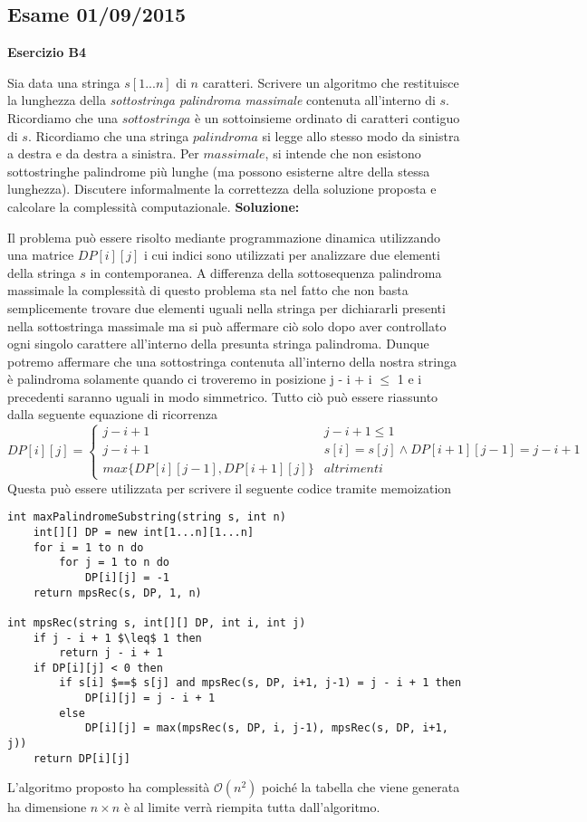 \documentclass[../cheatSheetAlgoritmi.tex]{subfiles}
\begin{document}
\subsection{Esame 01/09/2015}
\textbf{Esercizio B4}

Sia data una stringa $s[1...n]$ di $n$ caratteri. Scrivere un algoritmo che restituisce la lunghezza della \emph{sottostringa palindroma massimale} contenuta all'interno di $s$. Ricordiamo che una $sottostringa$ è un sottoinsieme ordinato di caratteri contiguo di $s$. Ricordiamo che una stringa $palindroma$ si legge allo stesso modo da sinistra a destra e da destra a sinistra. Per $massimale$, si intende che non esistono sottostringhe palindrome più lunghe (ma possono esisterne altre della stessa lunghezza). Discutere informalmente la correttezza della soluzione proposta e calcolare la complessità computazionale.
\textbf{Soluzione:}

Il problema può essere risolto mediante programmazione dinamica utilizzando una matrice $DP[i][j]$ i cui indici sono utilizzati per analizzare due elementi della stringa $s$ in contemporanea. A differenza della sottosequenza palindroma massimale la complessità di questo problema sta nel fatto che non basta semplicemente trovare due elementi uguali nella stringa per dichiararli presenti nella sottostringa massimale ma si può affermare ciò solo dopo aver controllato ogni singolo carattere all'interno della presunta stringa palindroma. Dunque potremo affermare che una sottostringa contenuta all'interno della nostra stringa è palindroma solamente quando ci troveremo in posizione j - i + i $\leq$ 1 e i precedenti saranno uguali in modo simmetrico. Tutto ciò può essere riassunto dalla seguente equazione di ricorrenza
\begin{equation*}
  	DP[i][j]=\begin{cases}
  		j - i + 1 & \text{$j - i + 1 \leq 1$}\\
  		j - i + 1 & \text{$s[i] = s[j] \land DP[i+1][j-1] = j - i + 1$}\\
  		max\{DP[i][j-1], DP[i+1][j]\} & \text{$altrimenti$}
  	\end{cases}
\end{equation*}
Questa può essere utilizzata per scrivere il seguente codice tramite memoization
\begin{lstlisting}[caption=Sottostringa Palindroma Massimale]
int maxPalindromeSubstring(string s, int n)
	int[][] DP = new int[1...n][1...n]
	for i = 1 to n do
		for j = 1 to n do
			DP[i][j] = -1
	return mpsRec(s, DP, 1, n)
	
int mpsRec(string s, int[][] DP, int i, int j)
	if j - i + 1 $\leq$ 1 then
		return j - i + 1
	if DP[i][j] < 0 then
		if s[i] $==$ s[j] and mpsRec(s, DP, i+1, j-1) = j - i + 1 then
			DP[i][j] = j - i + 1
		else 
			DP[i][j] = max(mpsRec(s, DP, i, j-1), mpsRec(s, DP, i+1, j)) 
	return DP[i][j]
\end{lstlisting}
L'algoritmo proposto ha complessità $\mathcal{O}(n^{2})$ poiché la tabella che viene generata ha dimensione $n \times n$ è al limite verrà riempita tutta dall'algoritmo. 
\newpage
\end{document}

